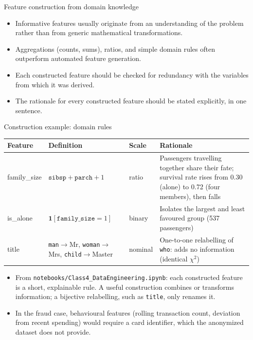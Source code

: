 \begin{frame}{Feature construction from domain knowledge}
\begin{itemize}
\item Informative features usually originate from an understanding of the problem rather than from generic mathematical transformations.
\item Aggregations (counts, sums), ratios, and simple domain rules often outperform automated feature generation.
\item Each constructed feature should be checked for redundancy with the variables from which it was derived.
\item The rationale for every constructed feature should be stated explicitly, in one sentence.
\end{itemize}
\coursefooter
\end{frame}

\begin{frame}{Construction example: domain rules}
\begingroup\footnotesize
\renewcommand{\arraystretch}{1.3}
\begin{tabularx}{\textwidth}{>{\ttfamily}l >{\raggedright\arraybackslash}p{4.2cm} l >{\raggedright\arraybackslash}X}
\normalfont\bfseries Feature & \bfseries Definition & \bfseries Scale & \bfseries Rationale \\
\toprule
family\_size & $\texttt{sibsp} + \texttt{parch} + 1$ & ratio & Passengers travelling together share their fate; survival rate rises from 0.30 (alone) to 0.72 (four members), then falls \\
is\_alone & $\mathbf{1}[\texttt{family\_size} = 1]$ & binary & Isolates the largest and least favoured group (537 passengers) \\
title & \texttt{man}$\to$Mr, \texttt{woman}$\to$Mrs, \texttt{child}$\to$Master & nominal & One-to-one relabelling of \texttt{who}: adds no information (identical $\chi^2$) \\
\bottomrule
\end{tabularx}
\par\endgroup
\vspace{0.6em}
\begin{itemize}\footnotesize
\item From \texttt{notebooks/Class4\_DataEngineering.ipynb}: each constructed feature is a short, explainable rule. A useful construction combines or transforms information; a bijective relabelling, such as \texttt{title}, only renames it.
\item In the fraud case, behavioural features (rolling transaction count, deviation from recent spending) would require a card identifier, which the anonymized dataset does not provide.
\end{itemize}
\coursefooter
\end{frame}

